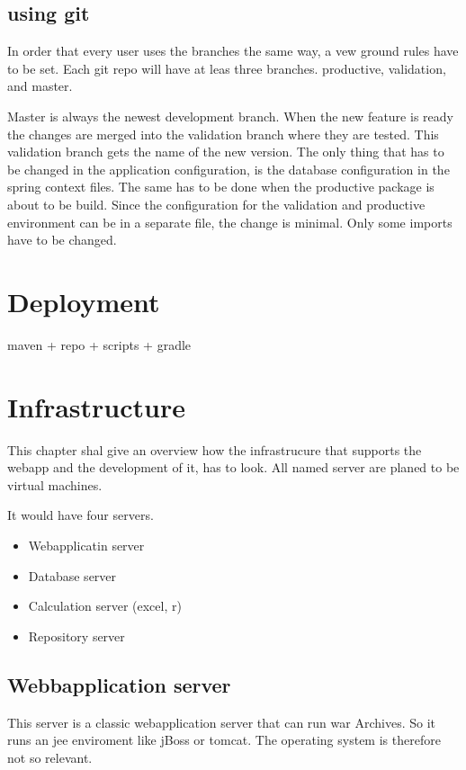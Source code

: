 \documentclass[paper=a4,twoside=false,BCOR=0mm,DIV=calc,fontsize=12pt]{scrartcl}
\begin{document}
\subsection{using git}
In order that every user uses the branches the same way, a vew ground rules have to be set.
Each git repo will have at leas three branches. productive, validation, and master.

Master is always the newest development branch. When the new feature is ready the changes are merged into the validation branch where they are tested. This validation branch gets the name of the new version.
The only thing that has to be changed in the application configuration, is the database configuration in the spring context files.
The same has to be done when the productive package is about to be build. Since the configuration for the validation and productive 
environment can be in a separate file, the change is minimal. Only some imports have to be changed.







\section{Deployment}

maven + repo + scripts + gradle


\section{Infrastructure}
This chapter shal give an overview how the infrastrucure that supports the webapp and the development of it, has to look. 
All named server are planed to be virtual machines.

It would have four servers. 
\begin{itemize}
 \item Webapplicatin server
 \item Database server
 \item Calculation server (excel, r)
 \item Repository server
\end{itemize}

\subsection{Webbapplication server}
This server is a classic webapplication server that can run war Archives. 
So it runs an jee enviroment like jBoss or tomcat.
The operating system is therefore not so relevant. 
\end{document}

